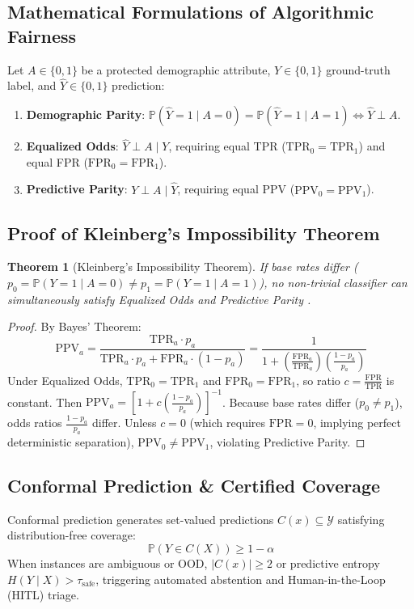 \documentclass[11pt,a4paper]{article}
\theoremstyle{definition}
\theoremstyle{plain}
\newtheorem{theorem}{Theorem}[section]
\theoremstyle{remark}
\begin{document}
\subsection{Mathematical Formulations of Algorithmic Fairness}
Let $A \in \{0, 1\}$ be a protected demographic attribute, $Y \in \{0, 1\}$ ground-truth label, and $\hat{Y} \in \{0, 1\}$ prediction:
\begin{enumerate}
    \item \textbf{Demographic Parity}: $\mathbb{P}(\hat{Y}=1 \mid A=0) = \mathbb{P}(\hat{Y}=1 \mid A=1) \iff \hat{Y} \perp A$.
    \item \textbf{Equalized Odds}: $\hat{Y} \perp A \mid Y$, requiring equal TPR ($\text{TPR}_0 = \text{TPR}_1$) and equal FPR ($\text{FPR}_0 = \text{FPR}_1$).
    \item \textbf{Predictive Parity}: $Y \perp A \mid \hat{Y}$, requiring equal PPV ($\text{PPV}_0 = \text{PPV}_1$).
\end{enumerate}

\subsection{Proof of Kleinberg's Impossibility Theorem}
\begin{theorem}[Kleinberg's Impossibility Theorem]
If base rates differ ($p_0 = \mathbb{P}(Y=1 \mid A=0) \neq p_1 = \mathbb{P}(Y=1 \mid A=1)$), no non-trivial classifier can simultaneously satisfy Equalized Odds and Predictive Parity \cite{kleinberg2016inherent}.
\end{theorem}
\begin{proof}
By Bayes' Theorem:
\begin{equation}
\mathrm{PPV}_a = \frac{\mathrm{TPR}_a \cdot p_a}{\mathrm{TPR}_a \cdot p_a + \mathrm{FPR}_a \cdot (1 - p_a)} = \frac{1}{1 + \left( \frac{\mathrm{FPR}_a}{\mathrm{TPR}_a} \right) \left( \frac{1 - p_a}{p_a} \right)}
\end{equation}
Under Equalized Odds, $\mathrm{TPR}_0 = \mathrm{TPR}_1$ and $\mathrm{FPR}_0 = \mathrm{FPR}_1$, so ratio $c = \frac{\mathrm{FPR}}{\mathrm{TPR}}$ is constant.
Then $\mathrm{PPV}_a = \left[ 1 + c \left( \frac{1 - p_a}{p_a} \right) \right]^{-1}$. Because base rates differ ($p_0 \neq p_1$), odds ratios $\frac{1 - p_a}{p_a}$ differ. Unless $c = 0$ (which requires $\mathrm{FPR} = 0$, implying perfect deterministic separation), $\mathrm{PPV}_0 \neq \mathrm{PPV}_1$, violating Predictive Parity.
\end{proof}

\subsection{Conformal Prediction \& Certified Coverage}
Conformal prediction generates set-valued predictions $C(x) \subseteq \mathcal{Y}$ satisfying distribution-free coverage:
\begin{equation}
\mathbb{P}(Y \in C(X)) \ge 1 - \alpha
\end{equation}
When instances are ambiguous or OOD, $|C(x)| \ge 2$ or predictive entropy $H(Y \mid X) > \tau_{\mathrm{safe}}$, triggering automated abstention and Human-in-the-Loop (HITL) triage.
\end{document}
